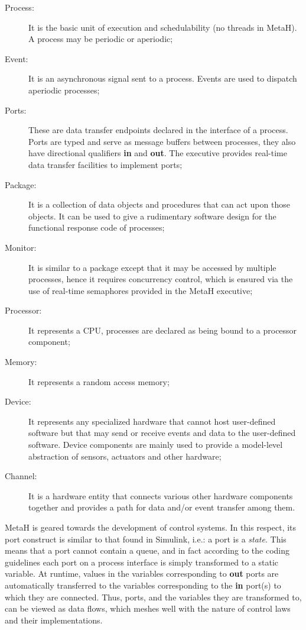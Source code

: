 \begin{description}
\item[Process:]{It is the basic unit of execution and schedulability
  (no threads in MetaH). A process may be periodic or aperiodic;}
\item[Event:]{It is an asynchronous signal sent to a process. Events
  are used to dispatch aperiodic processes;}
\item[Ports:]{These are data transfer endpoints declared in the
  interface of a process. Ports are typed and serve as message buffers
  between processes, they also have directional qualifiers \textbf{in}
  and \textbf{out}. The executive provides real-time data transfer
  facilities to implement ports;}
\item[Package:]{It is a collection of data objects and procedures that
  can act upon those objects. It can be used to give a rudimentary
  software design for the functional response code of processes;}
\item[Monitor:]{It is similar to a package except that it may be
  accessed by multiple processes, hence it requires concurrency
  control, which is ensured via the use of real-time semaphores
  provided in the MetaH executive;}
\item[Processor:]{It represents a CPU, processes are declared as being
  bound to a processor component;}
\item[Memory:]{It represents a random access memory;}
\item[Device:]{It represents any specialized hardware that cannot host
  user-defined software but that may send or receive events and data
  to the user-defined software. Device components are mainly used to
  provide a model-level abstraction of sensors, actuators and other
  hardware;}
\item[Channel:]{It is a hardware entity that connects various other
  hardware components together and provides a path for data and/or
  event transfer among them.}
\end{description}

MetaH is geared towards the development of control systems. In this
respect, its port construct is similar to that found in Simulink,
i.e.: a port is a \emph{state}. This means that a port cannot contain
a queue, and in fact according to the coding guidelines each port on a
process interface is simply transformed to a static variable. At
runtime, values in the variables corresponding to \textbf{out} ports
are automatically transferred to the variables corresponding to the
\textbf{in} port(s) to which they are connected. Thus, ports, and the
variables they are transformed to, can be viewed as data flows, which
meshes well with the nature of control laws and their implementations.

